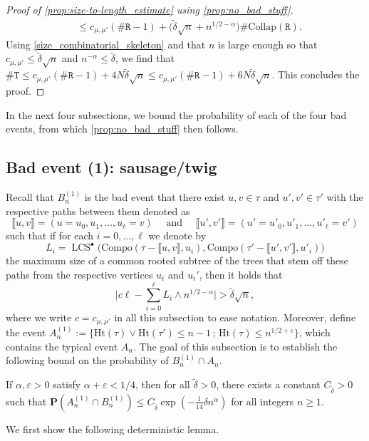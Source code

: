 \documentclass[11pt,reqno]{amsart}
\newcommand{\1}{\mathbf{1}}
\newcommand{\0}{\mathbf{0}}
\newcommand{\ttT}{\mathtt{T}}
\newcommand{\ttR}{\mathtt{R}}
\newcommand{\e}{\varepsilon}
\newcommand{\prob}{\mathbf{P}}
\newcommand{\Ht}{\mathrm{Ht}}
\newcommand{\LCS}{\operatorname{LCS}}
\begin{document}
\begin{proof}[Proof of \cref{prop:size-to-length_estimate} using \cref{prop:no_bad_stuff}]
\begin{align*}
&\leq c_{\mu,\mu'}(\#\ttR-1) +\big(\tilde{\delta}\sqrt{n}+n^{1/2-\alpha}\big)\#\mathrm{Collap}(\ttR).
\end{align*}
Using \eqref{size_combinatorial_skeleton} and that $n$ is large enough so that $c_{\mu,\mu'}\leq \tilde{\delta}\sqrt{n}$ and $n^{-\alpha}\leq \tilde{\delta}$, we find that $\#\ttT\leq c_{\mu,\mu'}(\#\ttR-1)+4N\tilde{\delta}\sqrt{n}\leq c_{\mu,\mu'}(\#\ttR-1)+6N\tilde{\delta}\sqrt{n}$. This concludes the proof.
\end{proof}

In the next four subsections, we bound the probability of each of the four bad events, from which \cref{prop:no_bad_stuff} then follows. 


\subsection{Bad event (1): sausage/twig}
Recall that $B_n^{(1)}$ is the bad event that there exist $u,v\in \tau$ and $u',v'\in\tau'$ with the respective paths between them denoted as
\[\llbracket u,v\rrbracket=(u=u_0,u_1,\dots, u_\ell=v)\quad\text{ and }\quad\llbracket u',v'\rrbracket=(u'=u'_0,u'_1,\dots, u'_\ell=v')\]
such that if for each $i=0,\dots,\ell$ we denote by
\[L_i=\LCS^\bullet\big(\mathrm{Compo}(\tau-\llbracket u,v \rrbracket, u_i),\mathrm{Compo}(\tau'-\llbracket u',v' \rrbracket, u'_i)\big)\]
the maximum size of a common rooted subtree of the trees that stem off these paths from the respective vertices $u_i$ and $u_i'$, then it holds that 
\[\bigg|c\ell-\sum_{i=0}^{\ell} L_i\wedge n^{1/2-\alpha}\bigg|> \tilde{\delta} \sqrt{n},\]
where we write $c=c_{\mu,\mu'}$ in all this subsection to ease notation. Moreover, define the event $A_n^{(1)}:=\{\Ht(\tau) \vee \Ht(\tau') \leq n-1 \,;\, \Ht(\tau) \leq n^{1/2+\e}\}$, which contains the typical event $A_n$. The goal of this subsection is to establish the following bound on the probability of $B_n^{(1)}\cap A_n$. 

\begin{prop}
\label{prop:no_sausages}
    If $\alpha,\varepsilon>0$ satisfy $\alpha+\varepsilon<1/4$, then for all $\tilde\delta>0$, there exists a constant $C_{\tilde\delta}>0$ such that $\prob(A_n^{(1)}\cap B^{(1)}_n)\le C_{\tilde\delta}\exp(-\tfrac{1}{14}\delta n^{\alpha})$ for all integers $n\geq 1$.
\end{prop} 
    
We first show the following deterministic lemma. 
\end{document}
